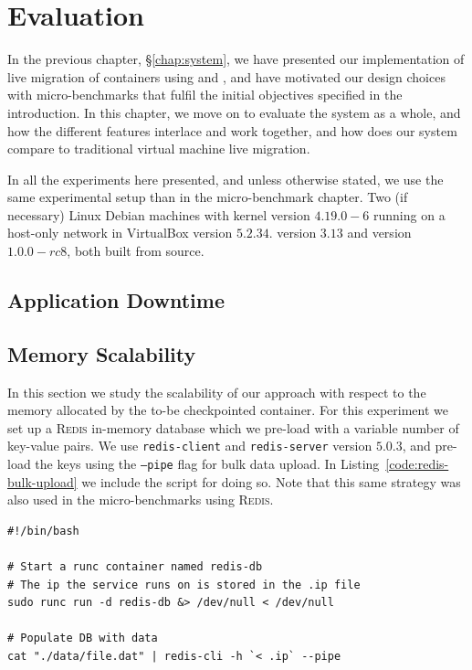 \chapter{Evaluation} \label{chap:evaluation}

In the previous chapter, \S\ref{chap:system}, we have presented our implementation of live migration of containers using \criu and \runc, and have motivated our design choices with micro-benchmarks that fulfil the initial objectives specified in the introduction.
In this chapter, we move on to evaluate the system as a whole, and how the different features interlace and work together, and  how does our system compare to traditional virtual machine live migration.

In all the experiments here presented, and unless otherwise stated, we use the same experimental setup than in the micro-benchmark chapter.
Two (if necessary) Linux Debian machines with kernel version $4.19.0-6$ running on a host-only network in VirtualBox version $5.2.34$.
\criu version $3.13$ and \runc version $1.0.0-rc8$, both built from source.

\section{Application Downtime}



\section{Memory Scalability}

In this section we study the scalability of our approach with respect to the memory allocated by the to-be checkpointed container.
For this experiment we set up a \textsc{Redis} in-memory database which we pre-load with a variable number of key-value pairs.
We use \texttt{redis-client} and \texttt{redis-server} version $5.0.3$, and pre-load the keys using the \texttt{--pipe} flag for bulk data upload.
In Listing~\ref{code:redis-bulk-upload} we include the script for doing so.
Note that this same strategy was also used in the micro-benchmarks using \textsc{Redis}.
\begin{lstlisting}[style=Bash,caption={Snippet for bulk data upload to a Redis database.},label={code:redis-bulk-upload}]
#!/bin/bash

# Start a runc container named redis-db
# The ip the service runs on is stored in the .ip file
sudo runc run -d redis-db &> /dev/null < /dev/null

# Populate DB with data
cat "./data/file.dat" | redis-cli -h `< .ip` --pipe
\end{lstlisting}

